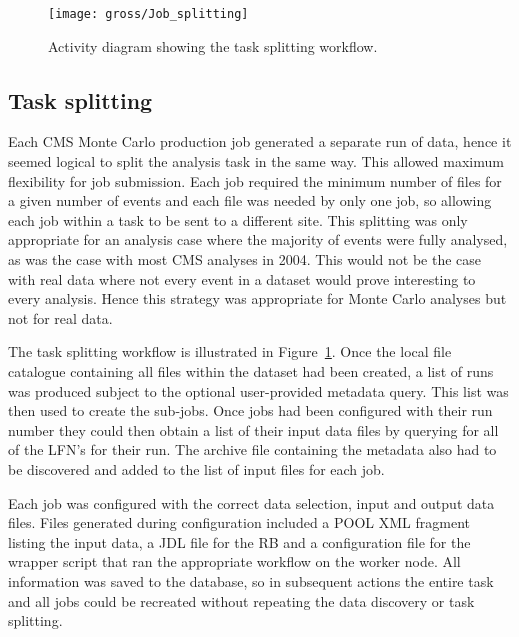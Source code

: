 
\begin{figure}[!tbp]
  \centering
  \texttt{[image: gross/Job\_splitting]}\\[1mm]
  \caption{Activity diagram showing the task splitting workflow. 
  \label{fig:task_splitting}}
\end{figure}

\subsection{Task splitting}
Each CMS Monte Carlo production job generated a separate run of data, hence it seemed logical to split the analysis task in the same way. This allowed maximum flexibility for job submission. Each job required the minimum number of files for a given number of events and each file was needed by only one job, so allowing each job within a task to be sent to a different site. This splitting was only appropriate for an analysis case where the majority of events were fully analysed, as was the case with most CMS analyses in 2004. This would not be the case with real data where not every event in a dataset would prove interesting to every analysis. Hence this strategy was appropriate for Monte Carlo analyses but not for real data.

The task splitting workflow is illustrated in Figure~\ref{fig:task_splitting}. Once the local file catalogue containing all files within the dataset had been created, a list of runs was produced subject to the optional user-provided metadata query. This list was then used to create the sub-jobs. Once jobs had been configured with their run number they could then obtain a list of their input data files by querying for all of the LFN's for their run. The archive file containing the metadata also had to be discovered and added to the list of input files for each job.


Each job was configured with the correct data selection, input and output data files. Files generated during configuration included a POOL XML fragment listing the input data, a JDL file for the RB and a configuration file for the wrapper script that ran the appropriate workflow on the worker node. All information was saved to the database, so in subsequent actions the entire task and all jobs could be recreated without repeating the data discovery or task splitting.

